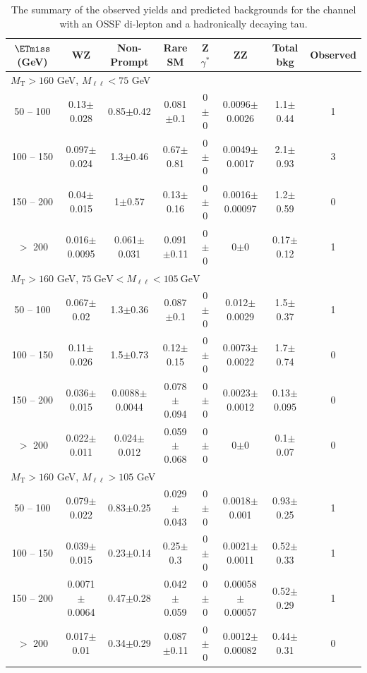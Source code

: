 \begin{table}
\scriptsize
\begin{center}
\caption{\label{tab:OSSF1tau1} The summary of the observed yields and predicted backgrounds for the channel 
with an OSSF di-lepton and a hadronically decaying tau. }
\begin{tabular}{| c | c c c c c c c | }\hline\hline
$\ETmiss$ (GeV) & WZ & Non-Prompt & Rare SM & Z$\gamma^*$ & ZZ & Total bkg & Observed\\\hline\hline
\multicolumn{8}{l}{$M_{\text{T}} > 160$ GeV, $M_{\ell\ell} < 75$ GeV}\\\hline\hline
50 -- 100&0.13$\pm$0.028&0.85$\pm$0.42&0.081$\pm$0.1&0$\pm$0&0.0096$\pm$0.0026&1.1$\pm$0.44&1\\
100 -- 150&0.097$\pm$0.024&1.3$\pm$0.46&0.67$\pm$0.81&0$\pm$0&0.0049$\pm$0.0017&2.1$\pm$0.93&3\\
150 -- 200&0.04$\pm$0.015&1$\pm$0.57&0.13$\pm$0.16&0$\pm$0&0.0016$\pm$0.00097&1.2$\pm$0.59&0\\
$>$ 200&0.016$\pm$0.0095&0.061$\pm$0.031&0.091$\pm$0.11&0$\pm$0&0$\pm$0&0.17$\pm$0.12&1\\
\hline\hline
\multicolumn{8}{l}{$M_{\text{T}} > 160$ GeV, $75~\mathrm{GeV} < M_{\ell\ell} < 105~\mathrm{GeV}$}\\\hline\hline
50 -- 100&0.067$\pm$0.02&1.3$\pm$0.36&0.087$\pm$0.1&0$\pm$0&0.012$\pm$0.0029&1.5$\pm$0.37&1\\
100 -- 150&0.11$\pm$0.026&1.5$\pm$0.73&0.12$\pm$0.15&0$\pm$0&0.0073$\pm$0.0022&1.7$\pm$0.74&0\\
150 -- 200&0.036$\pm$0.015&0.0088$\pm$0.0044&0.078$\pm$0.094&0$\pm$0&0.0023$\pm$0.0012&0.13$\pm$0.095&0\\
$>$ 200&0.022$\pm$0.011&0.024$\pm$0.012&0.059$\pm$0.068&0$\pm$0&0$\pm$0&0.1$\pm$0.07&0\\
\hline\hline
\multicolumn{8}{l}{$M_{\text{T}} > 160$ GeV, $M_{\ell\ell} > 105$ GeV}\\\hline\hline
50 -- 100&0.079$\pm$0.022&0.83$\pm$0.25&0.029$\pm$0.043&0$\pm$0&0.0018$\pm$0.001&0.93$\pm$0.25&1\\
100 -- 150&0.039$\pm$0.015&0.23$\pm$0.14&0.25$\pm$0.3&0$\pm$0&0.0021$\pm$0.0011&0.52$\pm$0.33&1\\
150 -- 200&0.0071$\pm$0.0064&0.47$\pm$0.28&0.042$\pm$0.059&0$\pm$0&0.00058$\pm$0.00057&0.52$\pm$0.29&1\\
$>$ 200&0.017$\pm$0.01&0.34$\pm$0.29&0.087$\pm$0.11&0$\pm$0&0.0012$\pm$0.00082&0.44$\pm$0.31&0\\
\hline\hline

\end{tabular}
\end{center}
\end{table}
